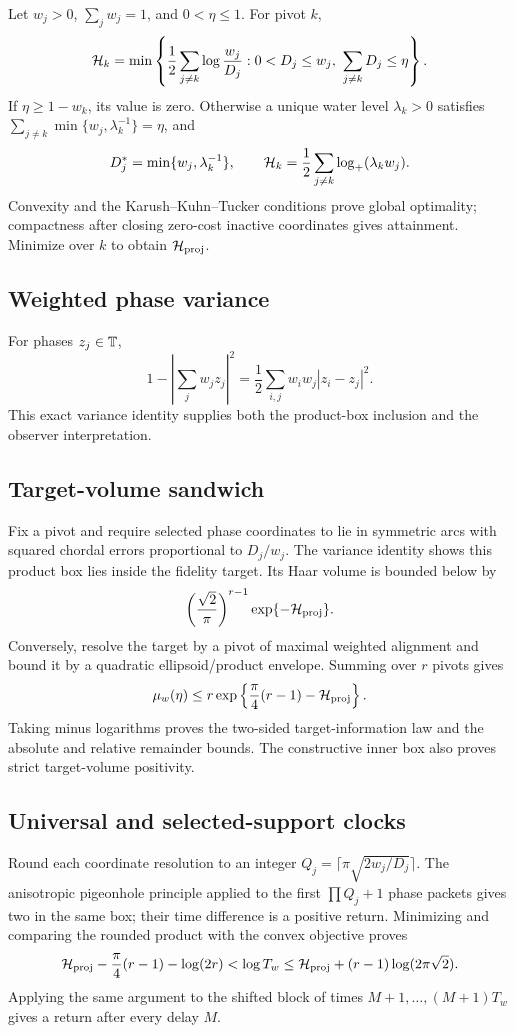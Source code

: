 Let $w_j>0$, $\sum_jw_j=1$, and $0<\eta\le1$.  For pivot $k$,
\[
 \mathcal H_k=\min\left\{\frac12\sum_{j\ne k}\log\frac{w_j}{D_j}:
 0<D_j\le w_j,\ \sum_{j\ne k}D_j\le\eta\right\}.
\]
If $\eta\ge1-w_k$, its value is zero.  Otherwise a unique water level
$\lambda_k>0$ satisfies
$\sum_{j\ne k}\min\{w_j,\lambda_k^{-1}\}=\eta$, and
\[
 D_j^*=\min\{w_j,\lambda_k^{-1}\},\qquad
 \mathcal H_k=\frac12\sum_{j\ne k}\log_+(\lambda_kw_j).
\]
Convexity and the Karush--Kuhn--Tucker conditions prove global optimality;
compactness after closing zero-cost inactive coordinates gives attainment.
Minimize over $k$ to obtain $\mathcal H_{\rm proj}$.

\subsection{Weighted phase variance}

For phases $z_j\in\mathbb T$,
\[
 1-\left|\sum_jw_jz_j\right|^2
 =\frac12\sum_{i,j}w_iw_j|z_i-z_j|^2.
\]
This exact variance identity supplies both the product-box inclusion and the
observer interpretation.

\subsection{Target-volume sandwich}

Fix a pivot and require selected phase coordinates to lie in symmetric arcs
with squared chordal errors proportional to $D_j/w_j$.  The variance
identity shows this product box lies inside the fidelity target.  Its Haar
volume is bounded below by
\[
 \left(\frac{\sqrt2}{\pi}\right)^{r-1}
 \exp\{-\mathcal H_{\rm proj}\}.
\]
Conversely, resolve the target by a pivot of maximal weighted alignment and
bound it by a quadratic ellipsoid/product envelope.  Summing over $r$
pivots gives
\[
 \mu_w(\eta)\le
 r\exp\left\{\frac\pi4(r-1)-\mathcal H_{\rm proj}\right\}.
\]
Taking minus logarithms proves the two-sided target-information law and the
absolute and relative remainder bounds.  The constructive inner box also
proves strict target-volume positivity.

\subsection{Universal and selected-support clocks}

Round each coordinate resolution to an integer
$Q_j=\lceil\pi\sqrt{2w_j/D_j}\rceil$.  The anisotropic pigeonhole principle
applied to the first $\prod Q_j+1$ phase packets gives two in the same box;
their time difference is a positive return.  Minimizing and comparing the
rounded product with the convex objective proves
\[
 \mathcal H_{\rm proj}-\frac\pi4(r-1)-\log(2r)
 <\log T_w
 \le\mathcal H_{\rm proj}+(r-1)\log(2\pi\sqrt2).
\]
Applying the same argument to the shifted block of times
$M+1,\ldots,(M+1)T_w$ gives a return after every delay $M$.

